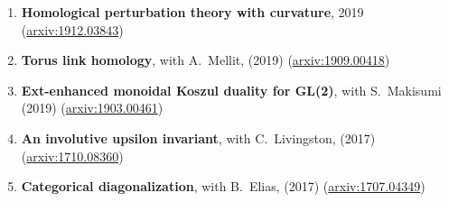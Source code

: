 \documentclass[12pt]{amsart}
\begin{document}
\begin{enumerate}

\item {\bf Homological perturbation theory with curvature}, 2019 (\href{https://arxiv.org/abs/1912.03843}{arxiv:1912.03843})

\item {\bf Torus link homology}, with A.~Mellit, (2019) (\href{https://arxiv.org/abs/1909.00418}{arxiv:1909.00418})






\item {\bf Ext-enhanced monoidal Koszul duality for GL(2)}, with S.~Makisumi (2019) (\href{https://arxiv.org/abs/1903.00461}{arxiv:1903.00461})






%

\item{\bf An involutive upsilon invariant}, with C.~Livingston, (2017)\\
(\href{http://arxiv.org/abs/1710.08360}{arxiv:1710.08360})


\item{\bf Categorical diagonalization}, with B.~Elias, (2017) (\href{http://arxiv.org/abs/1707.04349}{arxiv:1707.04349})


\end{enumerate}
\end{document}
